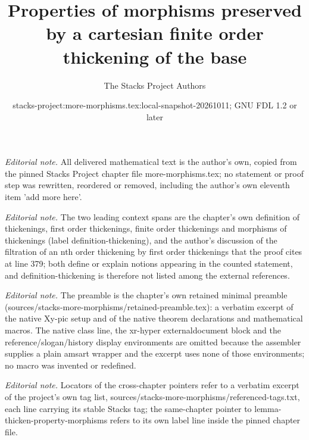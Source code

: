 \documentclass[10pt,a4paper]{amsart}
\title{Properties of morphisms preserved by a cartesian finite order thickening of the base}
\author{The Stacks Project Authors}
\date{stacks-project:more-morphisms.tex:local-snapshot-20261011; GNU FDL 1.2 or later}
\theoremstyle{plain}
\theoremstyle{definition}
\theoremstyle{remark}
\numberwithin{equation}{subsection}
\begin{document}
\maketitle
\noindent\textit{Editorial note.} All delivered mathematical text is the author's own, copied from the pinned Stacks Project chapter file more-morphisms.tex; no statement or proof step was rewritten, reordered or removed, including the author's own eleventh item 'add more here'.\par\medskip
\noindent\textit{Editorial note.} The two leading context spans are the chapter's own definition of thickenings, first order thickenings, finite order thickenings and morphisms of thickenings (label definition-thickening), and the author's discussion of the filtration of an nth order thickening by first order thickenings that the proof cites at line 379; both define or explain notions appearing in the counted statement, and definition-thickening is therefore not listed among the external references.\par\medskip
\noindent\textit{Editorial note.} The preamble is the chapter's own retained minimal preamble (sources/stacks-more-morphisms/retained-preamble.tex): a verbatim excerpt of the native Xy-pic setup and of the native theorem declarations and mathematical macros. The native class line, the xr-hyper externaldocument block and the reference/slogan/history display environments are omitted because the assembler supplies a plain amsart wrapper and the excerpt uses none of those environments; no macro was invented or redefined.\par\medskip
\noindent\textit{Editorial note.} Locators of the cross-chapter pointers refer to a verbatim excerpt of the project's own tag list, sources/stacks-more-morphisms/referenced-tags.txt, each line carrying its stable Stacks tag; the same-chapter pointer to lemma-thicken-property-morphisms refers to its own label line inside the pinned chapter file.\par\medskip
\end{document}
